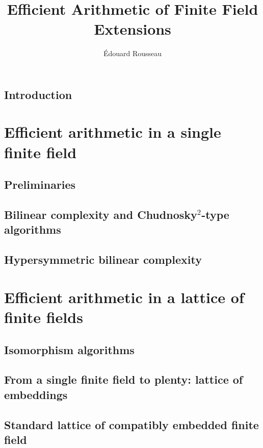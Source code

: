 \documentclass[a4paper,11pt]{report}
\title{Efficient Arithmetic of Finite Field Extensions}
\author{Édouard Rousseau}
\begin{document}
\maketitle



\dominitoc
\tableofcontents


%

\chapter{Introduction}


\part{Efficient arithmetic in a single finite field}
\label{part:single}

\chapter{Preliminaries}
\label{chap:preliminary}


\chapter{Bilinear complexity and Chudnosky$^2$-type algorithms}
\label{chap:bilinear}


\chapter{Hypersymmetric bilinear complexity}
\label{chap:hypersymmetric}


\part{Efficient arithmetic in a lattice of finite fields}
\label{part:lattice}

\chapter{Isomorphism algorithms}
\label{chap:isomorphism}


\chapter{From a single finite field to plenty: lattice of embeddings}
\label{chap:lattice}


\chapter{Standard lattice of compatibly embedded finite field}
\label{chap:standard}


\clearpage


\end{document}
